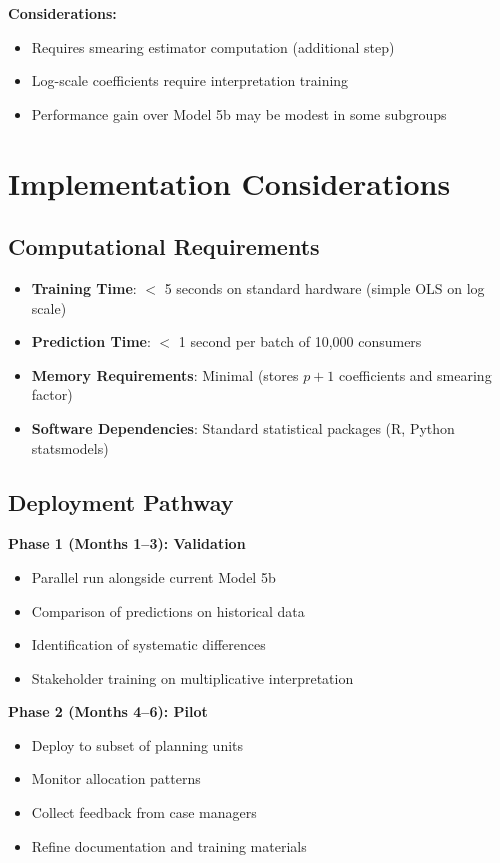 \textbf{Considerations:}
\begin{itemize}
    \item Requires smearing estimator computation (additional step)
    \item Log-scale coefficients require interpretation training
    \item Performance gain over Model 5b may be modest in some subgroups
\end{itemize}

\section{Implementation Considerations}

\subsection{Computational Requirements}

\begin{itemize}
    \item \textbf{Training Time}: $<$ 5 seconds on standard hardware (simple OLS on log scale)
    \item \textbf{Prediction Time}: $<$ 1 second per batch of 10,000 consumers
    \item \textbf{Memory Requirements}: Minimal (stores $p+1$ coefficients and smearing factor)
    \item \textbf{Software Dependencies}: Standard statistical packages (R, Python statsmodels)
\end{itemize}

\subsection{Deployment Pathway}

\textbf{Phase 1 (Months 1--3): Validation}
\begin{itemize}
    \item Parallel run alongside current Model 5b
    \item Comparison of predictions on historical data
    \item Identification of systematic differences
    \item Stakeholder training on multiplicative interpretation
\end{itemize}

\textbf{Phase 2 (Months 4--6): Pilot}
\begin{itemize}
    \item Deploy to subset of planning units
    \item Monitor allocation patterns
    \item Collect feedback from case managers
    \item Refine documentation and training materials
\end{itemize}

